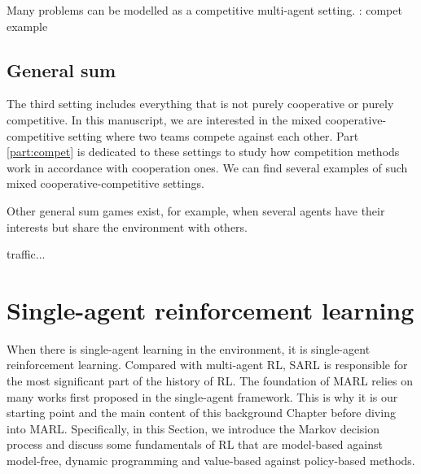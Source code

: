Many problems can be modelled as a competitive multi-agent setting.
\todo: compet example



\subsection{General sum} 
\label{sec:ch2_general_sum}
The third setting includes everything that is not purely cooperative or purely competitive.
In this manuscript, we are interested in the mixed cooperative-competitive setting where two teams compete against each other.
Part \ref{part:compet} is dedicated to these settings to study how competition methods work in accordance with cooperation ones.
\todo We can find several examples of such mixed cooperative-competitive settings.


Other general sum games exist, for example, when several agents have their interests but share the environment with others.

\todo traffic...


\section{Single-agent reinforcement learning} 
\label{sec:ch2_single_agent_RL}
When there is single-agent learning in the environment, it is single-agent reinforcement learning.
Compared with multi-agent RL, SARL is responsible for the most significant part of the history of RL.
The foundation of MARL relies on many works first proposed in the single-agent framework.
This is why it is our starting point and the main content of this background Chapter before diving into MARL.
Specifically, in this Section, we introduce the Markov decision process and discuss some fundamentals of RL that are model-based against model-free, dynamic programming and value-based against policy-based methods.

